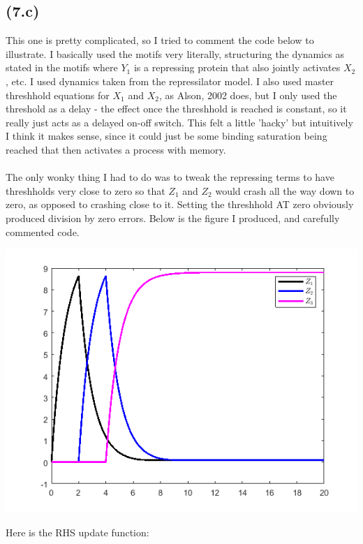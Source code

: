 \documentclass{article}
\begin{document}
\subsection*{\textbf{(7.c)}}
This one is pretty complicated, so I tried to comment the code below to illustrate. I basically used the motifs very literally, structuring the dynamics as stated in the motifs where $Y_1$ is a repressing protein that also jointly activates $X_2$, etc. I used dynamics taken from the repressilator model. I also used master threshhold equations for $X_1$ and $X_2$, as Alson, 2002 does, but I only used the threshold as a delay - the effect once the threshhold is reached is constant, so it really just acts as a delayed on-off switch. This felt a little 'hacky' but intuitively I think it makes sense, since it could just be some binding saturation being reached that then activates a process with memory.\\
\\
The only wonky thing I had to do was to tweak the repressing terms to have threshholds very close to zero so that $Z_1$ and $Z_2$ would crash all the way down to zero, as opposed to crashing close to it. Setting the threshhold AT zero obviously produced division by zero errors. Below is the figure I produced, and carefully commented code.
\begin{center}
    \includegraphics[scale = 1]{7c.png}
\end{center}
Here is the RHS update function:
\end{document}
